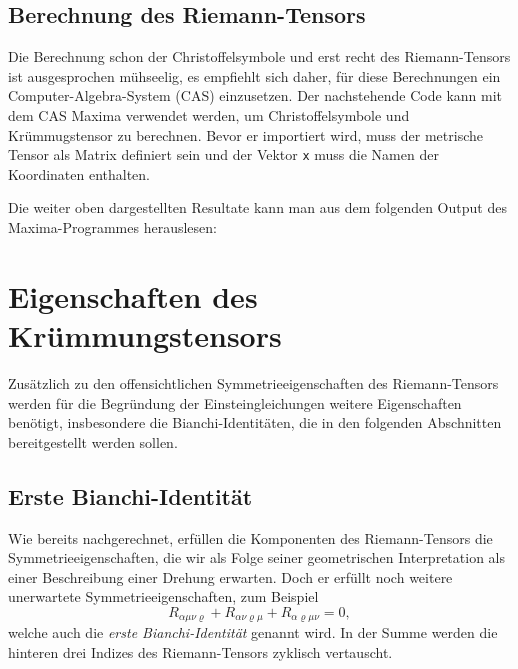 \subsection{Berechnung des Riemann-Tensors}
Die Berechnung schon der Christoffelsymbole und erst recht des
Riemann-Tensors ist ausgesprochen mühseelig, es empfiehlt sich
daher, für diese Berechnungen ein Computer-Algebra-System (CAS) einzusetzen.
Der nachstehende Code kann mit dem CAS Maxima verwendet werden, um
Christoffelsymbole und Krümmugstensor zu berechnen.
Bevor er importiert wird, muss der metrische Tensor als Matrix
definiert sein und der Vektor {\tt x} muss die Namen der Koordinaten
enthalten.


\label{skript:maxima:curvature}

Die weiter oben dargestellten Resultate kann man aus dem folgenden Output
des Maxima-Programmes herauslesen:
{\small

}

\section{Eigenschaften des Krümmungstensors}
Zusätzlich zu den offensichtlichen Symmetrieeigenschaften des Riemann-Tensors
werden für die Begründung der Einsteingleichungen weitere Eigenschaften
benötigt, insbesondere die Bianchi-Identitäten, die in den folgenden
Abschnitten bereitgestellt werden sollen.

\subsection{Erste Bianchi-Identität}
Wie bereits nachgerechnet, erfüllen die Komponenten des Riemann-Tensors
die Symmetrieeigenschaften, die wir als Folge seiner geometrischen
Interpretation als einer Beschreibung einer Drehung erwarten.
Doch er erfüllt noch weitere unerwartete Symmetrieeigenschaften, zum
Beispiel
\begin{equation}
R_{\alpha\mu\nu\varrho}
+
R_{\alpha\nu\varrho\mu}
+
R_{\alpha\varrho\mu\nu}
=0,
\label{skript:kruemmung:bianchi1}
\end{equation}
welche auch die {\em erste Bianchi-Identität} genannt wird.
%
In der Summe werden die hinteren drei Indizes des Riemann-Tensors
zyklisch vertauscht.

